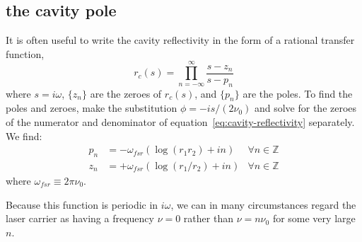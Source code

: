 \subsection{the cavity pole}
It is often useful to write the cavity reflectivity in the form of a
rational transfer function,
\begin{equation}
r_c(s) = \prod_{n=-\infty}^{\infty} \frac {s-z_n} {s-p_n}
\label{eq:rational-function}
\end{equation}
where $s=i\omega$, $\{z_n\}$ are the zeroes of $r_c(s)$, and $\{p_n\}$
are the poles.  To find the poles and zeroes, make the substitution
$\phi=-is/(2\nu_0)$ and solve for the zeroes of the numerator and
denominator of equation~\ref{eq:cavity-reflectivity} separately.  We find:
\begin{align}
p_n &= - \omega_{fsr} \left(\log\left(r_1 r_2\right) +  i n\right)  & \forall n\in \mathbb{Z}\\
z_n &= + \omega_{fsr} \left(\log\left(r_1/r_2\right) +  i n\right)  & \forall n\in \mathbb{Z}
\end{align}
where $\omega_{fsr}\equiv2\pi\nu_0$.

Because this function is periodic in $i\omega$, we can in many
circumstances regard the laser carrier as having a frequency
$\nu=0$ rather than $\nu = n\nu_0$ for some very large $n$.

